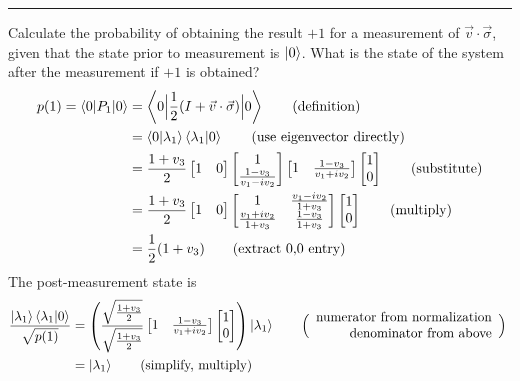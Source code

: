 \vspace{5pt}
\hrule
\vspace{5pt}
 Calculate the probability of obtaining the result $+1$ for a measurement of $\vec{v}\cdot\vec{\sigma}$, given that the state prior to measurement is $\ket{0}$.  What is the state of the system after the measurement if $+1$ is obtained?
\Soln 
\begin{align*}
	p(1) = \braket{0|P_1|0} &= \left\langle 0 \Big\lvert \frac{1}{2} ( I + \vec{v} \cdot \vec{\sigma} ) \Big\rvert 0\right\rangle \tag{definition}\\
	           &= \braket{0|\lambda_1}\braket{\lambda_1|0} \tag{use eigenvector directly}\\
	           &=\frac{1+v_3}{2}\begin{bmatrix}1&0\end{bmatrix}\begin{bmatrix}1 \\ \frac{1-v_3}{v_1-iv_2}\end{bmatrix}\begin{bmatrix}1 & \frac{1-v_3}{v_1+iv_2}\end{bmatrix}\begin{bmatrix}1\\0\end{bmatrix} \tag{substitute}\\
	           &= \frac{1+v_3}{2}\begin{bmatrix}1&0\end{bmatrix} \begin{bmatrix}
    	 1 & \frac{v_1 - iv_2}{1 + v_3} \\
    	 \frac{v_1 + iv_2}{1 + v_3} & \frac{1-v_3}{1+v_3}
	 \end{bmatrix}\begin{bmatrix}1\\0\end{bmatrix} \tag{multiply}\\
		&= \frac{1}{2} (1 + v_3) \tag{extract 0,0 entry}
\end{align*}
The post-measurement state is
\begin{align*} \frac{\ket{\lambda_1}\braket{\lambda_1|0}}{\sqrt{p(1)}} &=\left(\frac{\sqrt{\frac{1+v_3}{2}}}{\sqrt{\frac{1+v_3}{2}}}\begin{bmatrix}1 & \frac{1-v_3}{v_1+iv_2}\end{bmatrix}\begin{bmatrix}1\\0\end{bmatrix}\right) \ket{\lambda_1} \tag*{$\Bigl(\Bigr. \begin{array}{r}\text{numerator from normalization}\\ \text{denominator from above}\end{array} \Bigl.\Bigr)$ } \\
&= \ket{\lambda_1} \tag{simplify, multiply}
\end{align*}

